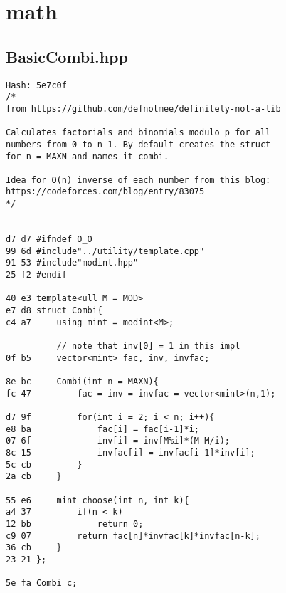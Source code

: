 \documentclass[11pt, a4paper, twoside]{article}
\begin{document}
%
%

\section{math}

\subsection{BasicCombi.hpp}
\begin{lstlisting}
Hash: 5e7c0f
/*
from https://github.com/defnotmee/definitely-not-a-lib

Calculates factorials and binomials modulo p for all 
numbers from 0 to n-1. By default creates the struct
for n = MAXN and names it combi.

Idea for O(n) inverse of each number from this blog:
https://codeforces.com/blog/entry/83075
*/


d7 d7 #ifndef O_O
99 6d #include"../utility/template.cpp"
91 53 #include"modint.hpp"
25 f2 #endif

40 e3 template<ull M = MOD>
e7 d8 struct Combi{
c4 a7     using mint = modint<M>;
      
          // note that inv[0] = 1 in this impl
0f b5     vector<mint> fac, inv, invfac;
      
8e bc     Combi(int n = MAXN){
fc 47         fac = inv = invfac = vector<mint>(n,1);
      
d7 9f         for(int i = 2; i < n; i++){
e8 ba             fac[i] = fac[i-1]*i;
07 6f             inv[i] = inv[M%i]*(M-M/i);
8c 15             invfac[i] = invfac[i-1]*inv[i];
5c cb         }
2a cb     }
      
55 e6     mint choose(int n, int k){
a4 37         if(n < k)
12 bb             return 0;
c9 07         return fac[n]*invfac[k]*invfac[n-k];
36 cb     }
23 21 };

5e fa Combi c;
\end{lstlisting}
\end{document}
